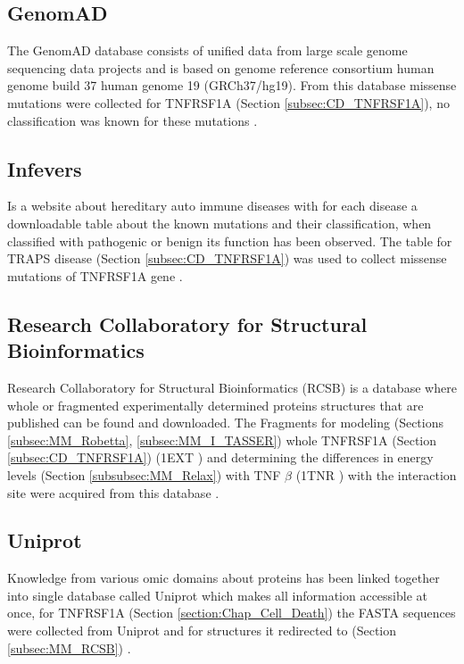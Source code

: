 \subsection{GenomAD}
The GenomAD database consists of unified data from large scale genome sequencing data projects and is based on genome reference consortium human genome build 37 human genome 19 (GRCh37/hg19). From this database missense mutations were collected for TNFRSF1A (Section \ref{subsec:CD_TNFRSF1A}), no classification was known for these mutations \cite{}.
\label{subsec:MM_GnomAD}

\subsection{Infevers}
Is a website about hereditary auto immune diseases with for each disease a downloadable table about the known mutations and their classification, when classified with pathogenic or benign its function has been observed. The table for TRAPS disease (Section \ref{subsec:CD_TNFRSF1A}) was used to collect missense mutations of TNFRSF1A gene \cite{}.
\label{subsec:MM_Infevers}

\subsection{Research Collaboratory for Structural Bioinformatics}
Research Collaboratory for Structural Bioinformatics (RCSB) is a database where whole or fragmented experimentally determined proteins structures that are published can be found and downloaded. The Fragments for modeling (Sections \ref{subsec:MM_Robetta}, \ref{subsec:MM_I_TASSER}) whole TNFRSF1A (Section \ref{subsec:CD_TNFRSF1A}) (1EXT \cite{}) and determining the differences in energy levels (Section \ref{subsubsec:MM_Relax}) with TNF $\beta$ (1TNR \cite{}) with the interaction site were acquired from this database \cite{}.
\label{subsec:MM_RCSB}

\subsection{Uniprot}
Knowledge from various omic domains about proteins has been linked together into single database called Uniprot which makes all information accessible at once, for TNFRSF1A (Section \ref{section:Chap_Cell_Death}) the FASTA sequences were collected from Uniprot and for structures it redirected to (Section \ref{subsec:MM_RCSB}) \cite{}.
\label{subsec:MM_Uniprot}


